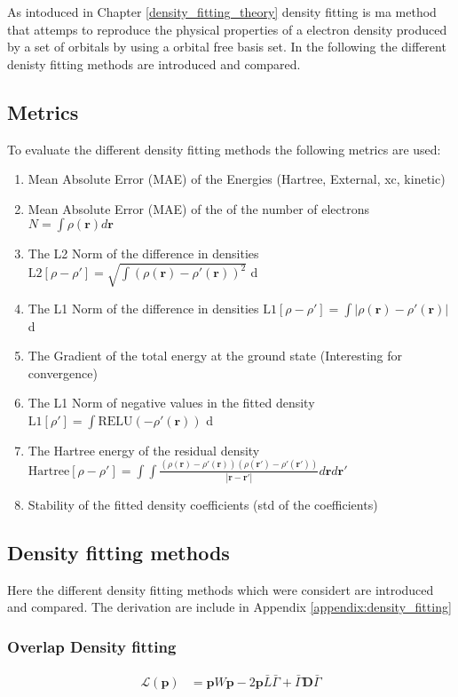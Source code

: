 \usepackage{amsmath}As intoduced in Chapter \ref{density_fitting_theory}
density fitting is ma method that attemps to reproduce the physical properties of a electron density produced by a set of orbitals by using a orbital free basis set.
In the following the different denisty fitting methods are introduced and compared.
\subsection{Metrics}
To evaluate the different density fitting methods the following metrics are used:
\begin{enumerate}
    \item Mean Absolute Error (MAE) of the Energies (Hartree, External, xc, kinetic)
    \item Mean Absolute Error (MAE) of the of the number of electrons $N = \int \rho(\mathbf{r}) d\mathbf{r}$
    \item The L2 Norm of the difference in densities $\text{L2}[\rho-\rho'] = \sqrt{\int (\rho(\mathbf{r})-\rho'(\mathbf{r}))^2}$ d
    \item The L1 Norm of the difference in densities $\text{L1}[\rho-\rho'] = \int |\rho(\mathbf{r})-\rho'(\mathbf{r})|$ d
    \item The Gradient of the total energy at the ground state (Interesting for convergence)
    \item The L1 Norm of negative values in the fitted density $\text{L1}[\rho'] = \int \text{RELU}(-\rho'(\mathbf{r}))$ d
    \item The Hartree energy of the residual density $\text{Hartree}[\rho-\rho'] = \int \int \frac{(\rho(\mathbf{r})-\rho'(\mathbf{r}))(\rho(\mathbf{r'})-\rho'(\mathbf{r'}))}{|\mathbf{r}-\mathbf{r'}|}d\mathbf{r}d\mathbf{r'}$
    \item Stability of the fitted density coefficients (std of the coefficients)
\end{enumerate}
\subsection{Density fitting methods}
Here the different density fitting methods which were considert are introduced and compared.
The derivation are include in Appendix \ref{appendix:density_fitting}
\subsubsection{Overlap Density fitting}
\begin{align}
        \mathcal{L}(\mathbf{p}) &= \mathbf{p} W \mathbf{p} - 2 \mathbf{p}\bar { L} \bar\Gamma + \bar\Gamma \mathbf{D}\bar\Gamma
\end{align}

